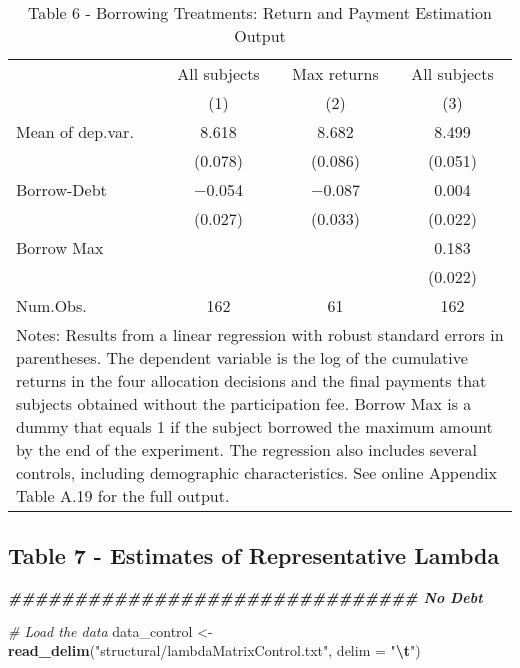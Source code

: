 \documentclass[
]{article}
\newenvironment{Shaded}{\begin{snugshade}}{\end{snugshade}}
\newcommand{\AttributeTok}[1]{\textcolor[rgb]{0.13,0.29,0.53}{#1}}
\newcommand{\CommentTok}[1]{\textcolor[rgb]{0.56,0.35,0.01}{\textit{#1}}}
\newcommand{\DocumentationTok}[1]{\textcolor[rgb]{0.56,0.35,0.01}{\textbf{\textit{#1}}}}
\newcommand{\FunctionTok}[1]{\textcolor[rgb]{0.13,0.29,0.53}{\textbf{#1}}}
\newcommand{\NormalTok}[1]{#1}
\newcommand{\OtherTok}[1]{\textcolor[rgb]{0.56,0.35,0.01}{#1}}
\newcommand{\SpecialCharTok}[1]{\textcolor[rgb]{0.81,0.36,0.00}{\textbf{#1}}}
\newcommand{\StringTok}[1]{\textcolor[rgb]{0.31,0.60,0.02}{#1}}
\begin{document}
\begin{table}
\centering
\caption{\label{tab:Table 6}Table 6 - Borrowing Treatments: Return and Payment Estimation Output}
\centering
\begin{tabular}[t]{lccc}
\toprule
\multicolumn{1}{c}{} & \multicolumn{1}{c}{All subjects} & \multicolumn{1}{c}{Max returns} & \multicolumn{1}{c}{All subjects} \\
\cmidrule(l{3pt}r{3pt}){2-2} \cmidrule(l{3pt}r{3pt}){3-3} \cmidrule(l{3pt}r{3pt}){4-4}
  & (1) & (2) & (3)\\
\midrule
Mean of dep.var. & \num{8.618} & \num{8.682} & \num{8.499}\\
 & (\num{0.078}) & (\num{0.086}) & (\num{0.051})\\
Borrow-Debt & \num{-0.054} & \num{-0.087} & \num{0.004}\\
 & (\num{0.027}) & (\num{0.033}) & (\num{0.022})\\
Borrow Max &  &  & \num{0.183}\\
 &  &  & (\num{0.022})\\
\midrule
Num.Obs. & \num{162} & \num{61} & \num{162}\\
\bottomrule
\multicolumn{4}{l}{\rule{0pt}{1em}Notes: Results from a linear regression with robust standard errors in parentheses. The dependent variable is the log of the cumulative returns in the four allocation decisions and the final payments that subjects obtained without the participation fee. Borrow Max is a dummy that equals 1 if the subject borrowed the maximum amount by the end of the experiment. The regression also includes several controls, including demographic characteristics. See online Appendix Table A.19 for the full output.}\\
\end{tabular}
\end{table}

\subsection{Table 7 - Estimates of Representative
Lambda}\label{table-7---estimates-of-representative-lambda}

\begin{Shaded}
\begin{Highlighting}[]
\DocumentationTok{\#\#\#\#\#\#\#\#\#\#\#\#\#\#\#\#\#\#\#\#\#\#\#\#\#\#\#\#\#\#\# No Debt}

\CommentTok{\# Load the data}
\NormalTok{data\_control }\OtherTok{\textless{}{-}} \FunctionTok{read\_delim}\NormalTok{(}\StringTok{"structural/lambdaMatrixControl.txt"}\NormalTok{, }\AttributeTok{delim =} \StringTok{"}\SpecialCharTok{\textbackslash{}t}\StringTok{"}\NormalTok{)}
\end{Highlighting}
\end{Shaded}
\end{document}
